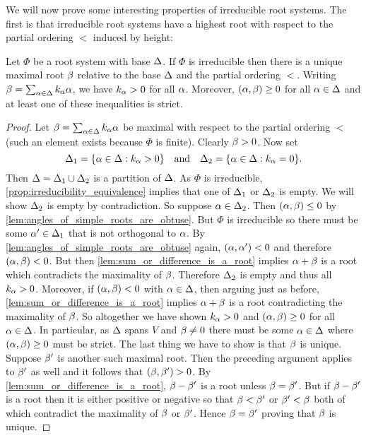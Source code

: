 \documentclass[12pt,reqno,oneside]{amsart}
\begin{document}
    \begin{center}
    \end{center}
    
    We will now prove some interesting properties of irreducible root systems. The first is that irreducible root systems have a highest root with respect to the partial ordering $<$ induced by height:
    
    \begin{proposition}\label{prop:highest_root}
        Let $\Phi$ be a root system with base $\Delta$. If $\Phi$ is irreducible then there is a unique maximal root $\beta$ relative to the base $\Delta$ and the partial ordering $<$. Writing $\beta = \sum_{\alpha \in \Delta}k_{\alpha}\alpha$, we have $k_{\alpha} > 0$ for all $\alpha$. Moreover, $(\alpha,\beta) \ge 0$ for all $\alpha \in \Delta$ and at least one of these inequalities is strict.
    \end{proposition}
    \begin{proof}
        Let $\beta = \sum_{\alpha \in \Delta}k_{\alpha}\alpha$ be maximal with respect to the partial ordering $<$ (such an element exists because $\Phi$ is finite). Clearly $\beta > 0$. Now set
        \[
            \Delta_{1} = \{\alpha \in \Delta:k_{\alpha} > 0\} \quad \text{and} \quad \Delta_{2} = \{\alpha \in \Delta:k_{\alpha} = 0\}.
        \]
        Then $\Delta = \Delta_{1} \cup \Delta_{2}$ is a partition of $\Delta$. As $\Phi$ is irreducible, \cref{prop:irreducibility_equivalence} implies that one of $\Delta_{1}$ or $\Delta_{2}$ is empty. We will show $\Delta_{2}$ is empty by contradiction. So suppose $\alpha \in \Delta_{2}$. Then $(\alpha,\beta) \le 0$ by \cref{lem:angles_of_simple_roots_are_obtuse}. But $\Phi$ is irreducible so there must be some $\alpha' \in \Delta_{1}$ that is not orthogonal to $\alpha$. By \cref{lem:angles_of_simple_roots_are_obtuse} again, $(\alpha,\alpha') < 0$ and therefore $(\alpha,\beta) < 0$. But then \cref{lem:sum_or_difference_is_a_root} implies $\alpha+\beta$ is a root which contradicts the maximality of $\beta$. Therefore $\Delta_{2}$ is empty and thus all $k_{\alpha} > 0$. Moreover, if $(\alpha,\beta) < 0$ with $\alpha \in \Delta$, then arguing just as before, \cref{lem:sum_or_difference_is_a_root} implies $\alpha+\beta$ is a root contradicting the maximality of $\beta$. So altogether we have shown $k_{\alpha} > 0$ and $(\alpha,\beta) \ge 0$ for all $\alpha \in \Delta$. In particular, as $\Delta$ spans $V$ and $\beta \neq 0$ there must be some $\alpha \in \Delta$ where $(\alpha,\beta) \ge 0$ must be strict. The last thing we have to show is that $\beta$ is unique. Suppose $\beta'$ is another such maximal root. Then the preceding argument applies to $\beta'$ as well and it follows that $(\beta,\beta') > 0$. By \cref{lem:sum_or_difference_is_a_root}, $\beta-\beta'$ is a root unless $\beta = \beta'$. But if $\beta-\beta'$ is a root then it is either positive or negative so that $\beta < \beta'$ or $\beta' < \beta$ both of which contradict the maximality of $\beta$ or $\beta'$. Hence $\beta = \beta'$ proving that $\beta$ is unique.
    \end{proof}
\end{document}
